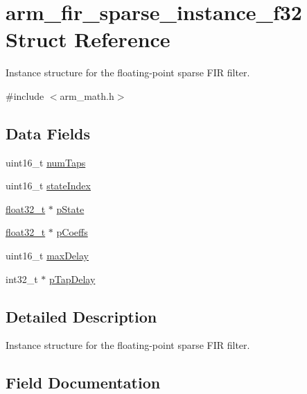 \hypertarget{structarm__fir__sparse__instance__f32}{}\section{arm\+\_\+fir\+\_\+sparse\+\_\+instance\+\_\+f32 Struct Reference}
\label{structarm__fir__sparse__instance__f32}


Instance structure for the floating-\/point sparse F\+IR filter.  




{\ttfamily \#include $<$arm\+\_\+math.\+h$>$}

\subsection*{Data Fields}
\begin{DoxyCompactItemize}
\item 
uint16\+\_\+t \mbox{\hyperlink{structarm__fir__sparse__instance__f32_a751941891e47f522a7f5375fe8990aac}{num\+Taps}}
\item 
uint16\+\_\+t \mbox{\hyperlink{structarm__fir__sparse__instance__f32_a566a0cb53437e48b9a3bf18e5b03d8aa}{state\+Index}}
\item 
\mbox{\hyperlink{arm__math_8h_a4611b605e45ab401f02cab15c5e38715}{float32\+\_\+t}} $\ast$ \mbox{\hyperlink{structarm__fir__sparse__instance__f32_a335c87e6fdc4b96601d95a5de8b9c463}{p\+State}}
\item 
\mbox{\hyperlink{arm__math_8h_a4611b605e45ab401f02cab15c5e38715}{float32\+\_\+t}} $\ast$ \mbox{\hyperlink{structarm__fir__sparse__instance__f32_aacbb8dd8eeba4b21fc2bb40076405ee3}{p\+Coeffs}}
\item 
uint16\+\_\+t \mbox{\hyperlink{structarm__fir__sparse__instance__f32_ab25f4ee7550e6d92acff77ada283733f}{max\+Delay}}
\item 
int32\+\_\+t $\ast$ \mbox{\hyperlink{structarm__fir__sparse__instance__f32_adec00b3793ab4f08edfeb4ea6a9eb6e6}{p\+Tap\+Delay}}
\end{DoxyCompactItemize}


\subsection{Detailed Description}
Instance structure for the floating-\/point sparse F\+IR filter. 

\subsection{Field Documentation}
\mbox{\label{structarm__fir__sparse__instance__f32_ab25f4ee7550e6d92acff77ada283733f}} 
